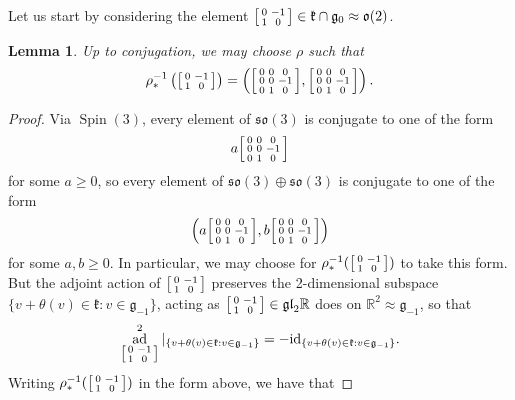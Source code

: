 \documentclass[12pt,a4paper]{amsart}
\newtheorem{lemma}[theorem]{Lemma}
\theoremstyle{definition}
\DeclareMathOperator{\ad}{ad}
\DeclareMathOperator{\Spin}{Spin}
\newenvironment{smallbmatrix}
  {\left[\begin{smallmatrix}}
  {\end{smallmatrix}\right]}
\newcommand{\rotoiso}{\begin{smallbmatrix}0 & -1 \\ 1 & 0\end{smallbmatrix}}
\begin{document}
Let us start by considering the element $\rotoiso\in\mathfrak{k}\cap\mathfrak{g}_0\approx\mathfrak{o}(2)$.

\begin{lemma}\label{setrotoiso} Up to conjugation, we may choose $\rho$ such that
\[\rho_*^{-1}\left(\rotoiso\right)=\left(\begin{smallbmatrix}0 & 0 & 0 \\ 0 & 0 & -1 \\ 0 & 1 & 0\end{smallbmatrix},\begin{smallbmatrix}0 & 0 & 0 \\ 0 & 0 & -1 \\ 0 & 1 & 0\end{smallbmatrix}\right).\]\end{lemma}
\begin{proof}Via $\Spin(3)$, every element of $\mathfrak{so}(3)$ is conjugate to one of the form
\[a\begin{smallbmatrix}0 & 0 & 0 \\ 0 & 0 & -1 \\ 0 & 1 & 0\end{smallbmatrix}\]
for some $a\geq 0$, so every element of $\mathfrak{so}(3)\oplus\mathfrak{so}(3)$ is conjugate to one of the form
\[\left(a\begin{smallbmatrix}0 & 0 & 0 \\ 0 & 0 & -1 \\ 0 & 1 & 0\end{smallbmatrix},b\begin{smallbmatrix}0 & 0 & 0 \\ 0 & 0 & -1 \\ 0 & 1 & 0\end{smallbmatrix}\right)\]
for some $a,b\geq 0$. In particular, we may choose for $\rho_*^{-1}(\rotoiso)$ to take this form. But the adjoint action of $\rotoiso$ preserves the 2-dimensional subspace $\{v+\theta(v)\in\mathfrak{k}:v\in\mathfrak{g}_{-1}\}$, acting as $\rotoiso\in\mathfrak{gl}_2\mathbb{R}$ does on $\mathbb{R}^2\approx\mathfrak{g}_{-1}$, so that
\[\ad_{\rotoiso}^2|_{\{v+\theta(v)\in\mathfrak{k}:v\in\mathfrak{g}_{-1}\}}=-\mathrm{id}_{\{v+\theta(v)\in\mathfrak{k}:v\in\mathfrak{g}_{-1}\}}.\]
Writing $\rho_*^{-1}(\rotoiso)$ in the form above, we have that

\end{proof}
\end{document}
